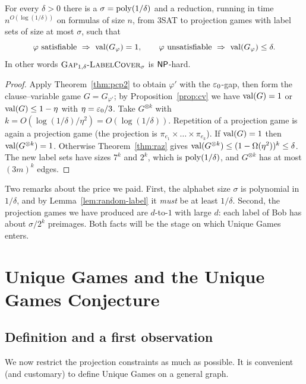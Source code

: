 \begin{theorem}\label{thm:lc}
For every $\delta>0$ there is a $\sigma=\operatorname{poly}(1/\delta)$ and a reduction, running in time
$n^{O(\log(1/\delta))}$ on formulas of size $n$, from $3$SAT to projection games with label sets
of size at most $\sigma$, such that
\[
  \varphi\text{ satisfiable}\ \Rightarrow\ \val(G_\varphi)=1,\qquad
  \varphi\text{ unsatisfiable}\ \Rightarrow\ \val(G_\varphi)\le\delta.
\]
In other words $\textsc{Gap}_{1,\delta}\text{-}\textsc{LabelCover}_{\sigma}$ is $\mathsf{NP}$-hard.
\end{theorem}
\begin{proof}
Apply Theorem~\ref{thm:pcp2} to obtain $\varphi'$ with the $\varepsilon_0$-gap, then form the
clause--variable game $G=G_{\varphi'}$; by Proposition~\ref{prop:cv} we have $\operatorname{val}(G)=1$ or $\operatorname{val}(G)\le1-\eta$
with $\eta=\varepsilon_0/3$.  Take $G^{\otimes k}$ with $k=O(\log(1/\delta)/\eta^2)=O(\log(1/\delta))$.  Repetition
of a projection game is again a projection game (the projection is $\pi_{e_1}\times\dots\times\pi_{e_k}$).
If $\operatorname{val}(G)=1$ then $\operatorname{val}(G^{\otimes k})=1$.  Otherwise Theorem~\ref{thm:raz} gives $\operatorname{val}(G^{\otimes k})\le(1-\Omega(\eta^2))^k\le\delta$.
The new label sets have sizes $7^k$ and $2^k$, which is $\operatorname{poly}(1/\delta)$, and $G^{\otimes k}$ has at most $(3m)^k$ edges.
\end{proof}

\noindent
Two remarks about the price we paid.  First, the alphabet size $\sigma$ is polynomial in $1/\delta$,
and by Lemma~\ref{lem:random-label} it \emph{must} be at least $1/\delta$.  Second, the projection games we
have produced are $d$-to-$1$ with large $d$: each label of Bob has about $\sigma/2^k$ preimages.
Both facts will be the stage on which Unique Games enters.


\section{Unique Games and the Unique Games Conjecture}
\label{sec:ug}

\subsection{Definition and a first observation}

We now restrict the projection constraints as much as possible.  It is convenient (and customary)
to define Unique Games on a general graph.

